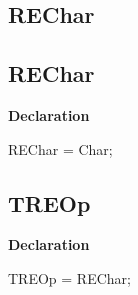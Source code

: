 \documentclass{report}
\newif\ifpdf
\begin{document}
\subsection*{\large{\textbf{REChar}}\normalsize\hspace{1ex}\hrulefill}
\else
\subsection*{REChar}
\fi
\label{RegExpr-REChar}
\begin{list}{}{
\setlength{\itemindent}{0cm}
\setlength{\listparindent}{0cm}
\setlength{\leftmargin}{\evensidemargin}
\addtolength{\leftmargin}{\tmplength}
\settowidth{\labelsep}{X}
\addtolength{\leftmargin}{\labelsep}
\setlength{\labelwidth}{\tmplength}
}
\item[\textbf{Declaration}\hfill]
\ifpdf
\begin{flushleft}
\fi
\begin{ttfamily}
REChar = Char;\end{ttfamily}

\ifpdf
\end{flushleft}
\fi

\end{list}
\ifpdf
\subsection*{\large{\textbf{TREOp}}\normalsize\hspace{1ex}\hrulefill}
\else
\subsection*{TREOp}
\fi
\label{RegExpr-TREOp}
\begin{list}{}{
\setlength{\itemindent}{0cm}
\setlength{\listparindent}{0cm}
\setlength{\leftmargin}{\evensidemargin}
\addtolength{\leftmargin}{\tmplength}
\settowidth{\labelsep}{X}
\addtolength{\leftmargin}{\labelsep}
\setlength{\labelwidth}{\tmplength}
}
\item[\textbf{Declaration}\hfill]
\ifpdf
\begin{flushleft}
\fi
\begin{ttfamily}
TREOp = REChar;\end{ttfamily}

\ifpdf
\end{flushleft}
\fi

\end{list}
\ifpdf
\end{document}
